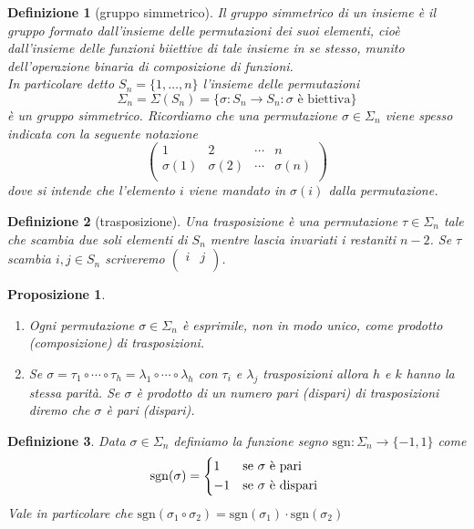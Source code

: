 \documentclass[9pt, a4paper]{article}
\newcommand{\sgn}{\mathrm{sgn}}
\theoremstyle{mythm}
\newtheorem{definition}{Definizione}[section]
\newtheorem{prop}[thm]{Proposizione}
\begin{document}
\begin{definition}[gruppo simmetrico]
	Il gruppo simmetrico di un insieme è il gruppo formato dall'insieme delle permutazioni dei suoi elementi, cioè dall'insieme delle funzioni biiettive di tale insieme in se stesso, munito dell'operazione binaria di composizione di funzioni. \\
	In particolare detto $ S_n = \{1, \ldots, n\} $ l'insieme delle permutazioni \[\Sigma_n = \Sigma (S_n) = \{\sigma \colon S_n \to S_n : \sigma \text{ è biettiva}\}\] è un gruppo simmetrico. Ricordiamo che una permutazione $ \sigma \in \Sigma_n $ viene spesso indicata con la seguente notazione 
	\[\begin{pmatrix}
	1 & 2 & \cdots & n \\
	\sigma (1) & \sigma (2) & \cdots & \sigma (n) \\
	\end{pmatrix}\]
	dove si intende che l'elemento $ i $ viene mandato in $ \sigma (i) $ dalla permutazione. 
\end{definition}

\begin{definition}[trasposizione]
	Una trasposizione è una permutazione $ \tau \in \Sigma_n $ tale che scambia due soli elementi di $ S_n $ mentre lascia invariati i restaniti $ n - 2 $. Se $ \tau $ scambia $ i, j \in S_n $ scriveremo $ \begin{pmatrix}
	i & j \\
	\end{pmatrix} $. 
\end{definition}

\begin{prop}
	\begin{enumerate}[label = (\roman*)]
		\item Ogni permutazione $ \sigma \in \Sigma_n $ è esprimile, non in modo unico, come prodotto (composizione) di trasposizioni. 
		\item Se $ \sigma = \tau_1 \circ \cdots \circ \tau_h = \lambda_1 \circ \cdots \circ \lambda_h $ con $ \tau_i $ e $ \lambda_j $ trasposizioni allora $ h $ e $ k $ hanno la stessa parità. Se $ \sigma $ è prodotto di un numero pari (dispari) di trasposizioni diremo che $ \sigma $ è pari (dispari). 
	\end{enumerate}
\end{prop}

\begin{definition}
	Data $ \sigma \in \Sigma_n $ definiamo la funzione segno $ \sgn \colon \Sigma_n \to \{-1, 1\} $ come 
	\[\sgn(\sigma) = 
	\begin{cases*}
	1 & se $ \sigma $ è pari \\
	-1 & se $ \sigma $ è dispari \\
	\end{cases*}\]
	Vale in particolare che $ \sgn(\sigma_1 \circ \sigma_2) = \sgn(\sigma_1) \cdot \sgn(\sigma_2) $
\end{definition}
\end{document}
